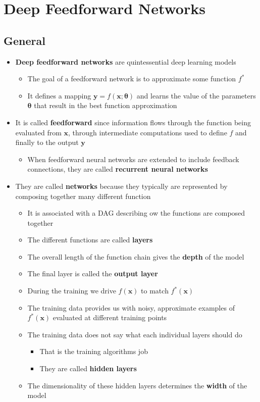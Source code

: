 \documentclass[11pt]{article}
\begin{document}
\section{Deep Feedforward Networks}
\label{sec:org92d738a}
\subsection{General}
\label{sec:org4021950}
\begin{itemize}
\item \textbf{Deep feedforward networks} are quintessential deep learning models 
\begin{itemize}
\item The goal of a feedforward network is to approximate some function \(f^*\)
\item It defines a mapping \(\pmb y = f(\pmb x; \pmb \theta)\) and learns the value of the parameters \(\pmb \theta\) that result in the best function approximation
\end{itemize}

\item It is called \textbf{feedforward} since information flows through the function being evaluated from \(\pmb x\), through intermediate computations used to define \(f\) and finally to the output \(\pmb y\)
\begin{itemize}
\item When feedforward neural networks are extended to include feedback connections, they are called \textbf{recurrent neural networks}
\end{itemize}

\item They are called \textbf{networks} because they typically are represented by composing together many different function
\begin{itemize}
\item It is associated with a DAG describing ow the functions are composed together
\item The different functions are called \textbf{layers}
\item The overall length of the function chain gives the \textbf{depth} of the model
\item The final layer is called the \textbf{output layer}
\item During the training we drive \(f(\pmb x)\) to match \(f^*(\pmb x)\)
\item The training data provides us with noisy, approximate examples of \(f^*(\pmb x)\) evaluated at different training points
\item The training data does not say what each individual layers should do
\begin{itemize}
\item That is the training algorithms job
\item They are called \textbf{hidden layers}
\end{itemize}
\item The dimensionality of these hidden layers determines the \textbf{width} of the model
\end{itemize}


\end{itemize}
\end{document}
